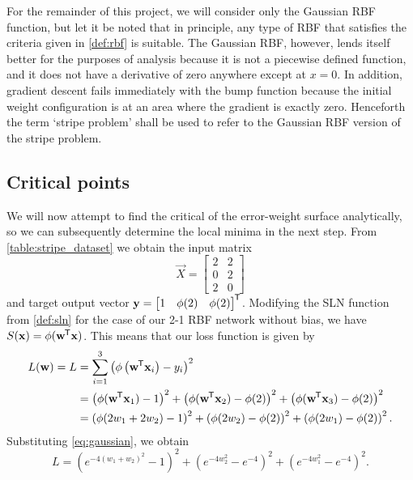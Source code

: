 For the remainder of this project, we will consider only the Gaussian RBF function, but let it be noted that in principle, any type of RBF that satisfies the criteria given in \ref{def:rbf} is suitable.
The Gaussian RBF, however, lends itself better for the purposes of analysis because it is not a piecewise defined function, and it does not have a derivative of zero anywhere except at $x=0$. 
In addition, gradient descent fails immediately with the bump function because the initial weight configuration is at an area where the gradient is exactly zero.
Henceforth the term `stripe problem' shall be used to refer to the Gaussian RBF version of the stripe problem. 

\subsection{Critical points}
\label{sec:stripe_critical_points}
We will now attempt to find the critical of the error-weight surface analytically, so we can subsequently determine the local minima in the next step. 
From \ref{table:stripe_dataset} we obtain the input matrix
\begin{equation*}
    \vec{X} = \begin{bmatrix}
        2 & 2 \\
        0 & 2 \\
        2 & 0
    \end{bmatrix}
\end{equation*}
and target output vector
$\mathbf{y} = \begin{bmatrix}
    1 & \phi(2) & \phi(2)
\end{bmatrix}^{\mkern-1.5mu\mathsf{T}}$.
Modifying the SLN function from \ref{def:sln} for the case of our 2-1 RBF network without bias, we have $S(\mathbf{x}) = \phi(\mathbf{w}^{\mkern-1.5mu\mathsf{T}} \mathbf{x})$.
This means that our loss function is given by
\begin{align*}
    L(\mathbf{w}) = L
    &= \sum_{i=1}^3{\left(\phi\left(\mathbf{w}^{\mkern-1.5mu\mathsf{T}} \mathbf{x}_i\right) - y_i\right)^2} \\
    &= \left(\phi(\mathbf{w}^{\mkern-1.5mu\mathsf{T}}\mathbf{x}_1) - 1\right)^2
     + \left(\phi(\mathbf{w}^{\mkern-1.5mu\mathsf{T}}\mathbf{x}_2) - \phi(2)\right)^2
     + \left(\phi(\mathbf{w}^{\mkern-1.5mu\mathsf{T}}\mathbf{x}_3) - \phi(2)\right)^2 \\
    &= \left(\phi(2 w_1 + 2 w_2) - 1\right)^2
     + \left(\phi(2 w_2) - \phi(2)\right)^2
     + \left(\phi(2 w_1) - \phi(2)\right)^2.
\end{align*}
Substituting \ref{eq:gaussian}, we obtain
\begin{equation}
    \label{eq:stripe_loss}
    L
     = \left(e^{-4(w_1 + w_2)^2} - 1\right)^2
     + \left(e^{-4w_2^2} - e^{-4}\right)^2
     + \left(e^{-4w_1^2} - e^{-4}\right)^2.
\end{equation}

